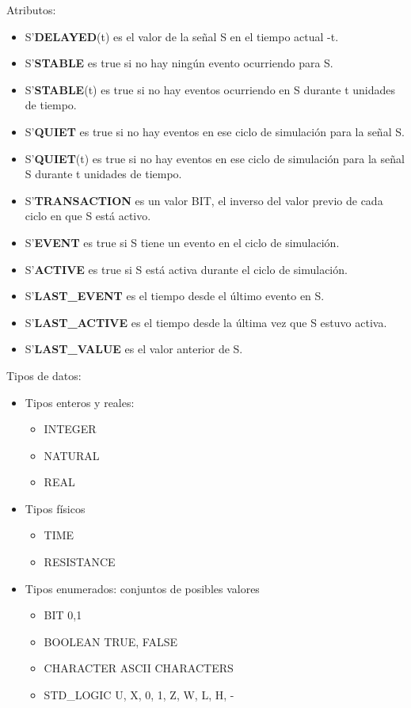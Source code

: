 Atributos:
\begin{itemize}
	\item S'\textbf{DELAYED}(t) es el valor de la señal S en el tiempo actual -t.
	\item S'\textbf{STABLE} es true si no hay ningún evento ocurriendo para S.
	\item S'\textbf{STABLE}(t) es true si no hay eventos ocurriendo en S durante t unidades de tiempo.
	\item S'\textbf{QUIET} es true si no hay eventos en ese ciclo de simulación para la señal S.
	\item S'\textbf{QUIET}(t) es true si no hay eventos en ese ciclo de simulación para la señal S durante t unidades de tiempo.
	\item S'\textbf{TRANSACTION} es un valor BIT, el inverso del valor previo de cada ciclo en que S está activo.
	\item S'\textbf{EVENT} es true si S tiene un evento en el ciclo de simulación.
	\item S'\textbf{ACTIVE} es true si S está activa durante el ciclo de simulación.
	\item S'\textbf{LAST\_EVENT} es el tiempo desde el último evento en S.
	\item S'\textbf{LAST\_ACTIVE} es el tiempo desde la última vez que S estuvo activa.
	\item S'\textbf{LAST\_VALUE} es el valor anterior de S.
\end{itemize}

Tipos de datos:
\begin{itemize}
	\item Tipos enteros y reales:
	      \begin{itemize}
		      \item INTEGER
		      \item NATURAL
		      \item REAL
	      \end{itemize}
	\item Tipos físicos
	      \begin{itemize}
		      \item TIME
		      \item RESISTANCE
	      \end{itemize}
	\item Tipos enumerados: conjuntos de posibles valores
	      \begin{itemize}
		      \item BIT {0,1}
		      \item BOOLEAN {TRUE, FALSE}
		      \item CHARACTER {ASCII CHARACTERS}
		      \item STD\_LOGIC {U, X, 0, 1, Z, W, L, H, -}
	      \end{itemize}
\end{itemize}

